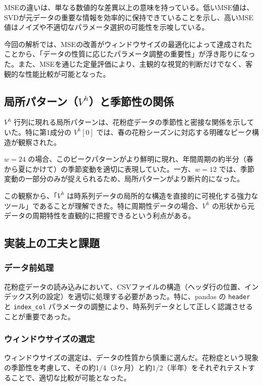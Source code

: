 \documentclass[a4paper,11pt]{jsarticle}
\begin{document}
MSEの違いは、単なる数値的な差異以上の意味を持っている。低いMSE値は、SVDが元データの重要な情報を効率的に保持できていることを示し、高いMSE値はノイズや不適切なパラメータ選択の可能性を示唆している。

今回の解析では、MSEの改善がウィンドウサイズの最適化によって達成されたことから、「データの性質に応じたパラメータ調整の重要性」が浮き彫りになった。また、MSEを通じた定量評価により、主観的な視覚的判断だけでなく、客観的な性能比較が可能となった。

\subsection{局所パターン（$V^h$）と季節性の関係}

$V^h$ 行列に現れる局所パターンは、花粉症データの季節性と密接な関係を示していた。特に第1成分の $V^h[0]$ では、春の花粉シーズンに対応する明確なピーク構造が観察された。

$w=24$ の場合、このピークパターンがより鮮明に現れ、年間周期の約半分（春から夏にかけて）の季節変動を適切に表現していた。一方、$w=12$ では、季節変動の一部分のみが捉えられるため、局所パターンがより断片的になった。

この観察から、「$V^h$ は時系列データの局所的な構造を直接的に可視化する強力なツール」であることが理解できた。特に周期性データの場合、$V^h$ の形状から元データの周期特性を直観的に把握できるという利点がある。

\subsection{実装上の工夫と課題}

\subsubsection{データ前処理}

花粉症データの読み込みにおいて、CSVファイルの構造（ヘッダ行の位置、インデックス列の設定）を適切に処理する必要があった。特に、pandas の \texttt{header} と \texttt{index\_col} パラメータの調整により、時系列データとして正しく認識させることが重要であった。

\subsubsection{ウィンドウサイズの選定}

ウィンドウサイズの選定は、データの性質から慎重に選んだ。花粉症という現象の季節性を考慮して、その約1/4（3ヶ月）と約1/2（半年）をそれぞれテストすることで、適切な比較が可能となった。
\end{document}
